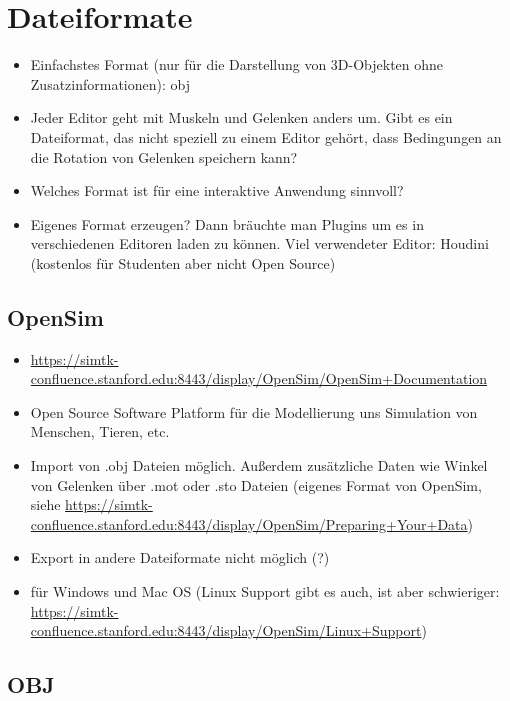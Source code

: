 \section{Dateiformate}

\begin{itemize}
 \item Einfachstes Format (nur für die Darstellung von 3D-Objekten ohne Zusatzinformationen): obj
 \item Jeder Editor geht mit Muskeln und Gelenken anders um. Gibt es ein Dateiformat, das nicht speziell zu einem Editor gehört, dass Bedingungen an die Rotation von Gelenken speichern kann?
 \item Welches Format ist für eine interaktive Anwendung sinnvoll?
 \item Eigenes Format erzeugen? Dann bräuchte man Plugins um es in verschiedenen Editoren laden zu können. Viel verwendeter Editor: Houdini (kostenlos für Studenten aber nicht Open Source)
\end{itemize}

\subsection{OpenSim}

\begin{itemize}
 \item \url{https://simtk-confluence.stanford.edu:8443/display/OpenSim/OpenSim+Documentation}
 \item Open Source Software Platform für die Modellierung uns Simulation von Menschen, Tieren, etc.
 \item Import von .obj Dateien möglich. Außerdem zusätzliche Daten wie Winkel von Gelenken über .mot oder .sto Dateien (eigenes Format von OpenSim, siehe \url{https://simtk-confluence.stanford.edu:8443/display/OpenSim/Preparing+Your+Data})
 \item Export in andere Dateiformate nicht möglich (?)
 \item für Windows und Mac OS (Linux Support gibt es auch, ist aber schwieriger: \url{https://simtk-confluence.stanford.edu:8443/display/OpenSim/Linux+Support}) %
\end{itemize}


\subsection{OBJ}

